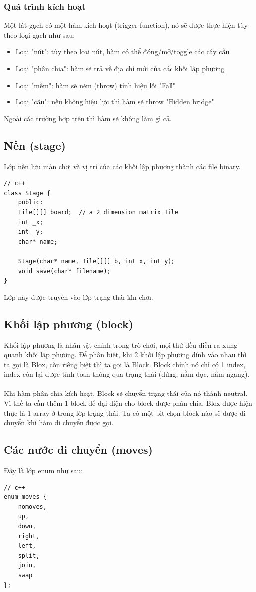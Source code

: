 \documentclass[a4paper, 11pt]{article}
\begin{document}
\subsubsection{Quá trình kích hoạt}
Một lát gạch có một hàm kích hoạt (trigger function), nó sẽ được thực hiện tùy theo loại gạch như sau:
\begin{itemize}
	\item Loại "nút": tùy theo loại nút, hàm có thể đóng/mở/toggle các cây cầu
	\item Loại "phân chia": hàm sẽ trả về địa chỉ mới của các khối lập phương
	\item Loại "mềm": hàm sẽ ném (throw) tính hiệu lỗi "Fall"
	\item Loại "cầu": nếu không hiệu lực thì hàm sẽ throw "Hidden bridge"
\end{itemize}
Ngoài các trường hợp trên thì hàm sẽ không làm gì cả.
\subsection{Nền (stage)}
Lớp nền lưu màn chơi và vị trí của các khối lập phương thành các file binary.
\begin{verbatim}
// c++
class Stage {
    public:
    Tile[][] board;  // a 2 dimension matrix Tile
    int _x;
    int _y;
    char* name;
    
    Stage(char* name, Tile[][] b, int x, int y);
    void save(char* filename);
}
\end{verbatim}
Lớp này được truyền vào lớp trạng thái khi chơi.
\subsection{Khối lập phương (block)}
Khối lập phương là nhân vật chính trong trò chơi, mọi thứ đều diễn ra xung quanh khối lập phương.
Để phân biệt, khi 2 khối lập phương dính vào nhau thì ta gọi là Blox, còn riêng biệt thì ta gọi là Block.
Block chính nó chỉ có 1 index, index còn lại được tính toán thông qua trạng thái (đứng, nằm dọc, nằm ngang). \\~\\
Khi hàm phân chia kích hoạt, Block sẽ chuyển trạng thái của nó thành neutral. Vì thế ta cần thêm 1 block để
đại diện cho block được phân chia. Blox được hiện thực là 1 array ở trong lớp trạng thái. Ta có một bit chọn
block nào sẽ được di chuyển khi hàm di chuyển được gọi.
\subsection{Các nước di chuyển (moves)}
Đây là lớp enum như sau:
\begin{verbatim}
// c++
enum moves {
    nomoves,
    up,
    down,
    right,
    left,
    split,
    join,
    swap
};
\end{verbatim}
\end{document}
